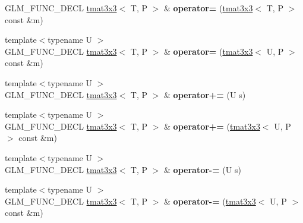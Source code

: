 \begin{DoxyCompactItemize}
\item 
\hypertarget{structglm_1_1detail_1_1tmat3x3_a7b73504291487e21519005578c6a900b}{G\-L\-M\-\_\-\-F\-U\-N\-C\-\_\-\-D\-E\-C\-L \hyperlink{structglm_1_1detail_1_1tmat3x3}{tmat3x3}$<$ T, P $>$ \& {\bfseries operator=} (\hyperlink{structglm_1_1detail_1_1tmat3x3}{tmat3x3}$<$ T, P $>$ const \&m)}\label{structglm_1_1detail_1_1tmat3x3_a7b73504291487e21519005578c6a900b}

\item 
\hypertarget{structglm_1_1detail_1_1tmat3x3_a0b69c604eee9037a4b3ad45290e8d2ed}{{\footnotesize template$<$typename U $>$ }\\G\-L\-M\-\_\-\-F\-U\-N\-C\-\_\-\-D\-E\-C\-L \hyperlink{structglm_1_1detail_1_1tmat3x3}{tmat3x3}$<$ T, P $>$ \& {\bfseries operator=} (\hyperlink{structglm_1_1detail_1_1tmat3x3}{tmat3x3}$<$ U, P $>$ const \&m)}\label{structglm_1_1detail_1_1tmat3x3_a0b69c604eee9037a4b3ad45290e8d2ed}

\item 
\hypertarget{structglm_1_1detail_1_1tmat3x3_a691337477f60d50bcdef7ae0372b1f06}{{\footnotesize template$<$typename U $>$ }\\G\-L\-M\-\_\-\-F\-U\-N\-C\-\_\-\-D\-E\-C\-L \hyperlink{structglm_1_1detail_1_1tmat3x3}{tmat3x3}$<$ T, P $>$ \& {\bfseries operator+=} (U s)}\label{structglm_1_1detail_1_1tmat3x3_a691337477f60d50bcdef7ae0372b1f06}

\item 
\hypertarget{structglm_1_1detail_1_1tmat3x3_a2e5ebe3eeb51b9e64924b818b7a7cd0d}{{\footnotesize template$<$typename U $>$ }\\G\-L\-M\-\_\-\-F\-U\-N\-C\-\_\-\-D\-E\-C\-L \hyperlink{structglm_1_1detail_1_1tmat3x3}{tmat3x3}$<$ T, P $>$ \& {\bfseries operator+=} (\hyperlink{structglm_1_1detail_1_1tmat3x3}{tmat3x3}$<$ U, P $>$ const \&m)}\label{structglm_1_1detail_1_1tmat3x3_a2e5ebe3eeb51b9e64924b818b7a7cd0d}

\item 
\hypertarget{structglm_1_1detail_1_1tmat3x3_a4ee83a0dd2a65d7e90b9b21479eee52a}{{\footnotesize template$<$typename U $>$ }\\G\-L\-M\-\_\-\-F\-U\-N\-C\-\_\-\-D\-E\-C\-L \hyperlink{structglm_1_1detail_1_1tmat3x3}{tmat3x3}$<$ T, P $>$ \& {\bfseries operator-\/=} (U s)}\label{structglm_1_1detail_1_1tmat3x3_a4ee83a0dd2a65d7e90b9b21479eee52a}

\item 
\hypertarget{structglm_1_1detail_1_1tmat3x3_acbadd4964bdf31cdd701bd509b8bad03}{{\footnotesize template$<$typename U $>$ }\\G\-L\-M\-\_\-\-F\-U\-N\-C\-\_\-\-D\-E\-C\-L \hyperlink{structglm_1_1detail_1_1tmat3x3}{tmat3x3}$<$ T, P $>$ \& {\bfseries operator-\/=} (\hyperlink{structglm_1_1detail_1_1tmat3x3}{tmat3x3}$<$ U, P $>$ const \&m)}\label{structglm_1_1detail_1_1tmat3x3_acbadd4964bdf31cdd701bd509b8bad03}


\end{DoxyCompactItemize}
